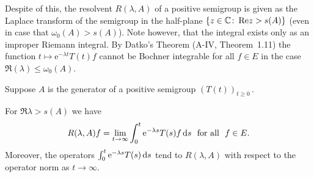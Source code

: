 Despite of this, the resolvent $R(\lambda,A)$ of a positive semigroup is given as the Laplace transform of the semigroup in the half-plane $\{z \in \mathbb{C}  \colon \mathop{}\!\mathrm{Re}  z > s(A)\}$ (even in case that $\omega_0(A) > s(A)$).
Note however, that the integral exists only as an improper Riemann integral.
By Datko's Theorem (A-IV, Theorem~1.11) the function $t \mapsto \mathrm{e}^{-\lambda t}T(t)f$ cannot be Bochner integrable for all $f \in E$ in the case $\Re(\lambda) \leq \omega_0(A)$.
\begin{theorem}\label{thm:c3-1.2}
	Suppose $A$ is the generator of a positive semigroup $(T(t))_{t\geq 0}$\,.
	
	For $\Re \lambda > s(A)$ we have
	\begin{equation}\label{eq:c3-1.1}
		R(\lambda,A)f = \lim_{t\to\infty} \int_{0}^t \mathrm{e}^{-\lambda s} T(s)f \mathop{}\!\mathrm{d}{s}  \ \text{ for all } \ f \in E.
	\end{equation}
	Moreover, the operators $\int_{0}^t \mathrm{e}^{-\lambda s} T(s) \mathop{}\!\mathrm{d}{s} $ tend to $R(\lambda,A)$ with respect to the operator norm as $t \to \infty$.
\end{theorem}
